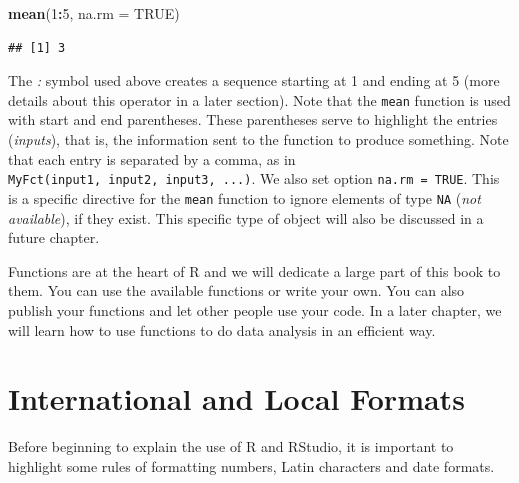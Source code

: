 \documentclass[11pt,]{book}
\newenvironment{Shaded}{\begin{snugshade}}{\end{snugshade}}
\newcommand{\KeywordTok}[1]{\textcolor[rgb]{0.27,0.27,0.27}{\textbf{#1}}}
\newcommand{\DataTypeTok}[1]{\textcolor[rgb]{0.27,0.27,0.27}{#1}}
\newcommand{\DecValTok}[1]{\textcolor[rgb]{0.06,0.06,0.06}{#1}}
\newcommand{\OtherTok}[1]{\textcolor[rgb]{0.56,0.35,0.01}{#1}}
\newcommand{\OperatorTok}[1]{\textcolor[rgb]{0.81,0.36,0.00}{\textbf{#1}}}
\newcommand{\NormalTok}[1]{#1}
\begin{document}
\begin{Shaded}
\begin{Highlighting}[]
\KeywordTok{mean}\NormalTok{(}\DecValTok{1}\OperatorTok{:}\DecValTok{5}\NormalTok{, }\DataTypeTok{na.rm =} \OtherTok{TRUE}\NormalTok{)}
\end{Highlighting}
\end{Shaded}

\begin{verbatim}
## [1] 3
\end{verbatim}

The \emph{:} symbol used above creates a sequence starting at 1 and
ending at 5 (more details about this operator in a later section). Note
that the \texttt{mean} function is used with start and end parentheses.
These parentheses serve to highlight the entries (\emph{inputs}), that
is, the information sent to the function to produce something. Note that
each entry is separated by a comma, as in
\texttt{MyFct(input1,\ input2,\ input3,\ ...)}. We also set option
\texttt{na.rm\ =\ TRUE}. This is a specific directive for the
\texttt{mean} function to ignore elements of type \texttt{NA} (\emph{not
available}), if they exist. This specific type of object will also be
discussed in a future chapter.

Functions are at the heart of R and we will dedicate a large part of
this book to them. You can use the available functions or write your
own. You can also publish your functions and let other people use your
code. In a later chapter, we will learn how to use functions to do data
analysis in an efficient way.

\section{International and Local
Formats}\label{international-and-local-formats}

Before beginning to explain the use of R and RStudio, it is important to
highlight some rules of formatting numbers, Latin characters and date
formats.
\end{document}
